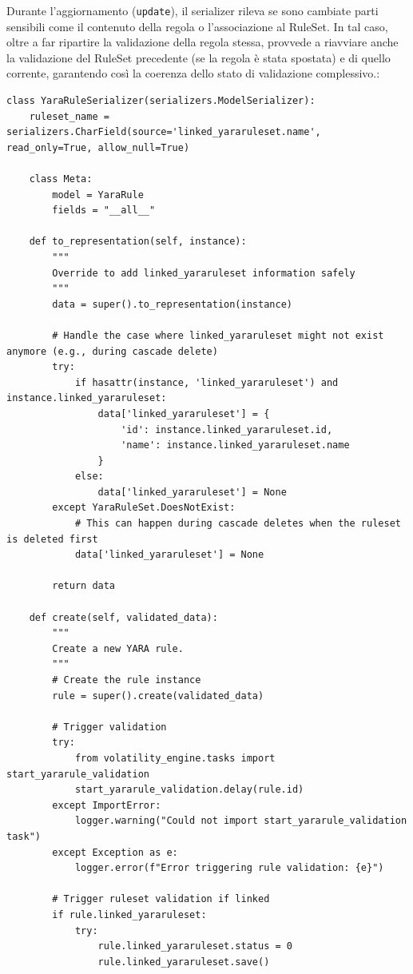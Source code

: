 Durante l’aggiornamento (\texttt{update}), il serializer rileva se sono cambiate parti sensibili come il contenuto della regola o l’associazione al RuleSet. In tal caso, oltre a far ripartire la validazione della regola stessa, provvede a riavviare anche la validazione del RuleSet precedente (se la regola è stata spostata) e di quello corrente, garantendo così la coerenza dello stato di validazione complessivo.:

\begin{verbatim}
class YaraRuleSerializer(serializers.ModelSerializer):
    ruleset_name = serializers.CharField(source='linked_yararuleset.name', read_only=True, allow_null=True)
    
    class Meta:
        model = YaraRule
        fields = "__all__"
    
    def to_representation(self, instance):
        """
        Override to add linked_yararuleset information safely
        """
        data = super().to_representation(instance)
        
        # Handle the case where linked_yararuleset might not exist anymore (e.g., during cascade delete)
        try:
            if hasattr(instance, 'linked_yararuleset') and instance.linked_yararuleset:
                data['linked_yararuleset'] = {
                    'id': instance.linked_yararuleset.id,
                    'name': instance.linked_yararuleset.name
                }
            else:
                data['linked_yararuleset'] = None
        except YaraRuleSet.DoesNotExist:
            # This can happen during cascade deletes when the ruleset is deleted first
            data['linked_yararuleset'] = None
        
        return data
    
    def create(self, validated_data):
        """
        Create a new YARA rule.
        """
        # Create the rule instance
        rule = super().create(validated_data)
        
        # Trigger validation
        try:
            from volatility_engine.tasks import start_yararule_validation
            start_yararule_validation.delay(rule.id)
        except ImportError:
            logger.warning("Could not import start_yararule_validation task")
        except Exception as e:
            logger.error(f"Error triggering rule validation: {e}")
        
        # Trigger ruleset validation if linked
        if rule.linked_yararuleset:
            try:
                rule.linked_yararuleset.status = 0
                rule.linked_yararuleset.save()
                

\end{verbatim}

